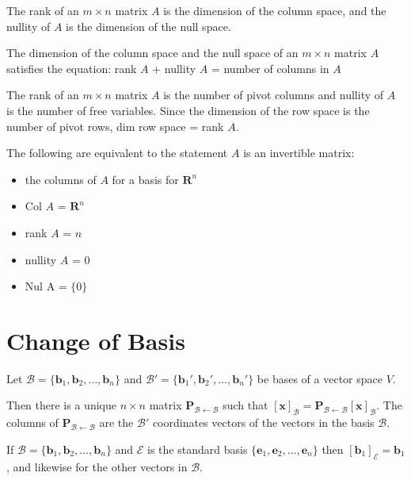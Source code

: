 \documentclass[../linalg.tex]{subfiles}
\begin{document}
The rank of an $m\times n$ matrix $A$ is the dimension of the column space, and the nullity of $A$ is the dimension of the null space.
\begin{theorem}
    The dimension of the column space and the null space of an $m\times n$ matrix $A$ satisfies the equation: rank $A$ + nullity $A$ = number of columns in $A$
\end{theorem}
The rank of an $m\times n$ matrix $A$ is the number of pivot columns and nullity of $A$ is the number of free variables. Since the dimension of the row space is the number of pivot rows, dim row space = rank $A$.

The following are equivalent to the statement $A$ is an invertible matrix:
\begin{itemize}
    \item the columns of $A$ for a basis for $\textbf{R}^n$
    \item Col $A$ = $\textbf{R}^n$
    \item rank $A$ = $n$
    \item nullity $A$ = 0
    \item Nul A = $\{0\}$
\end{itemize}

\section{Change of Basis}
\begin{theorem}
    Let $\mathcal{B}=\{\textbf{b}_1,\textbf{b}_2,\dots,\textbf{b}_n\}$ and $\mathcal{B}'=\{\textbf{b}_1',\textbf{b}_2',\dots,\textbf{b}_n'\}$ be bases of a vector space $V$.

    Then there is a unique $n\times n$ matrix $\textbf{P}_{\mathcal{B}\leftarrow \mathcal{B}}$ such that $[\textbf{x}]_{\mathcal{B}}=\textbf{P}_{\mathcal{B}\leftarrow \mathcal{B}}[\textbf{x}]_{\mathcal{B}}$. The columns of 
    $\textbf{P}_{\mathcal{B}\leftarrow \mathcal{B}}$ are the $\mathcal{B}'$ coordinates vectors of the vectors in the basis $\mathcal{B}$. 
\end{theorem}

If $\mathcal{B}=\{\textbf{b}_1,\textbf{b}_2,\dots,\textbf{b}_n\}$ and $\mathcal{E}$ is the standard basis $\{\textbf{e}_1,\textbf{e}_2,\dots,\textbf{e}_n\}$ then $[\textbf{b}_1]_{\mathcal{E}}=\textbf{b}_1$, and likewise for the other vectors in $\mathcal{B}$.
\end{document}
